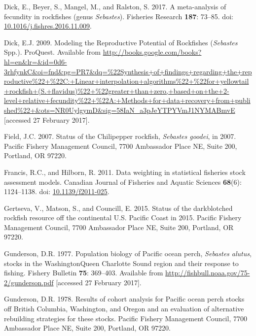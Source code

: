 \documentclass[12pt,]{article}
\begin{document}
\hypertarget{ref-dick_meta-analysis_2017}{}
Dick, E., Beyer, S., Mangel, M., and Ralston, S. 2017. A meta-analysis
of fecundity in rockfishes (genus \emph{Sebastes}). Fisheries Research
\textbf{187}: 73--85. doi:
\href{https://doi.org/10.1016/j.fishres.2016.11.009}{10.1016/j.fishres.2016.11.009}.

\hypertarget{ref-dick_modeling_2009}{}
Dick, E.J. 2009. Modeling the Reproductive Potential of Rockfishes
(\emph{Sebastes} Spp.). ProQuest. Available from
\url{http://books.google.com/books?hl=en\&lr=\&id=0d6-3rhfynkC\&oi=fnd\&pg=PR7\&dq=\%22Synthesis+of+findings+regarding+the+reproductive\%22+\%22C:+Linear+interpolation+algorithms\%22+\%22for+yellowtail+rockfish+(S.+flavidus)\%22+\%22greater+than+zero,+based+on+the+2-level+relative+fecundity\%22+\%22A:+Methods+for+data+recovery+from+published\%22+\&ots=NR0UylgymD\&sig=58IaN_a3pJeYTPYVmJ1NYMABmvE}
{[}accessed 27 February 2017{]}.

\hypertarget{ref-field_status_2007}{}
Field, J.C. 2007. Status of the Chilipepper rockfish, \emph{Sebastes
goodei}, in 2007. Pacific Fishery Management Council, 7700 Ambassador
Place NE, Suite 200, Portland, OR 97220.

\hypertarget{ref-francis_data_2011}{}
Francis, R.C., and Hilborn, R. 2011. Data weighting in statistical
fisheries stock assessment models. Canadian Journal of Fisheries and
Aquatic Sciences \textbf{68}(6): 1124--1138. doi:
\href{https://doi.org/10.1139/f2011-025}{10.1139/f2011-025}.

\hypertarget{ref-gertseva_status_2015}{}
Gertseva, V., Matson, S., and Councill, E. 2015. Status of the
darkblotched rockfish resource off the continental U.S. Pacific Coast in
2015. Pacific Fishery Management Council, 7700 Ambassador Place NE,
Suite 200, Portland, OR 97220.

\hypertarget{ref-gunderson_population_1977}{}
Gunderson, D.R. 1977. Population biology of Pacific ocean perch,
\emph{Sebastes alutus}, stocks in the WashingtonQueen Charlotte Sound
region and their response to fishing. Fishery Bulletin \textbf{75}:
369--403. Available from
\url{http://fishbull.noaa.gov/75-2/gunderson.pdf} {[}accessed 27
February 2017{]}.

\hypertarget{ref-gunderson_results_1978}{}
Gunderson, D.R. 1978. Results of cohort analysis for Pacific ocean perch
stocks off British Columbia, Washington, and Oregon and an evaluation of
alternative rebuilding strategies for these stocks. Pacific Fishery
Management Council, 7700 Ambassador Place NE, Suite 200, Portland, OR
97220.
\end{document}
